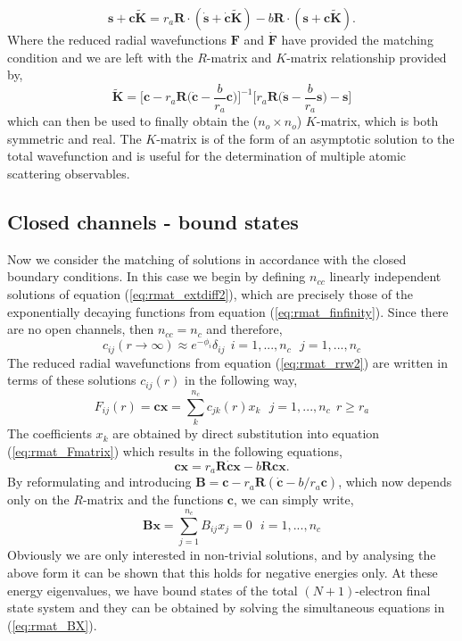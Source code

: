 \begin{equation}\label{eq:rmat_justK}
\boldsymbol{s}+\boldsymbol{c}\boldsymbol{\tilde{K}}=r_a\boldsymbol{R}\cdot(\boldsymbol{\dot{s}}+\boldsymbol{\dot{c}}\boldsymbol{\tilde{K}})-b\boldsymbol{R}\cdot(\boldsymbol{s}+\boldsymbol{c}\boldsymbol{\tilde{K}}).
\end{equation}
Where the reduced radial wavefunctions $\boldsymbol{F}$ and $\boldsymbol{\dot{F}}$ have provided the matching condition and we are left with the $R$-matrix and $K$-matrix relationship provided by,
\begin{equation}\label{eq:rmat_justK2}
\boldsymbol{\tilde{K}}=\Big[\boldsymbol{c}-r_a\boldsymbol{R}\Big(\boldsymbol{\dot{c}}-\frac{b}{r_a}\boldsymbol{c}\Big)\Big]^{-1}\Big[r_a\boldsymbol{R}\Big(\boldsymbol{\dot{s}}-\frac{b}{r_a}\boldsymbol{s}\Big)-\boldsymbol{s}\Big]
\end{equation}
which can then be used to finally obtain the ($n_o\times n_o$) $K$-matrix, which is both symmetric and real. The $K$-matrix is of the form of an asymptotic solution to the total wavefunction and is useful for the determination of multiple atomic scattering observables.

\subsection{Closed channels - bound states}\label{ssec:closed}
Now we consider the matching of solutions in accordance with the closed boundary conditions. In this case we begin by defining $n_{cc}$ linearly independent solutions of equation (\ref{eq:rmat_extdiff2}), which are precisely those of the exponentially decaying functions from equation (\ref{eq:rmat_finfinity}). Since there are no open channels, then $n_{cc} = n_c$ and therefore,
\begin{equation}\label{eq:rmat_c2}
c_{ij}(r\rightarrow \infty)\approx e^{-\phi_i}\delta_{ij}  ~~i=1, ..., n_c ~~~ j=1, ..., n_c
\end{equation}
The reduced radial wavefunctions from equation (\ref{eq:rmat_rrw2}) are written in terms of these solutions $c_{ij}(r)$ in the following way,
\[
F_{ij}(r)=\boldsymbol{cx}=\sum_{k}^{n_c}c_{jk}(r)x_k ~~~ j=1, ..., n_c ~~r\geq r_a
\]
The coefficients $x_k$ are obtained by direct substitution into equation (\ref{eq:rmat_Fmatrix}) which results in the following equations,
\[
\boldsymbol{cx}=r_a\boldsymbol{R\dot{c}x}-b\boldsymbol{Rcx}.
\]
By reformulating and introducing $\boldsymbol{B}=\boldsymbol{c}-r_a\boldsymbol{R}(\boldsymbol{\dot{c}}-b/r_a\boldsymbol{c})$, which now depends only on the $R$-matrix and the functions $\boldsymbol{c}$, we can simply write,
\begin{equation}\label{eq:rmat_BX}
\boldsymbol{Bx}=\sum_{j=1}^{n_c}B_{ij}x_j=0 ~~~ i=1, ..., n_c
\end{equation}
Obviously we are only interested in non-trivial solutions, and by analysing the above form it can be shown that this holds for negative energies only. At these energy eigenvalues, we have bound states of the total $(N+1)$-electron final state system and they can be obtained by solving the simultaneous equations in (\ref{eq:rmat_BX}).

